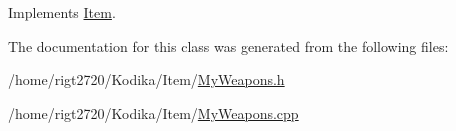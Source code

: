 Implements \hyperlink{classItem_abd3f52dd7fa25d497f2070e95d44ac03}{Item}.



The documentation for this class was generated from the following files\-:\begin{DoxyCompactItemize}
\item 
/home/rigt2720/\-Kodika/\-Item/\hyperlink{MyWeapons_8h}{My\-Weapons.\-h}\item 
/home/rigt2720/\-Kodika/\-Item/\hyperlink{MyWeapons_8cpp}{My\-Weapons.\-cpp}\end{DoxyCompactItemize}
